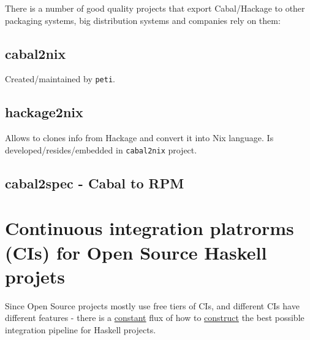 \documentclass[a4paper,14pt,oneside]{book}
\begin{document}
There is a number of good quality projects that export Cabal/Hackage to other packaging systems, big distribution systems and companies rely on them:

\section{cabal2nix}
\label{sec:org013737e}

Created/maintained by \texttt{peti}.

\section{hackage2nix}
\label{sec:org140e539}

Allows to clones info from Hackage and convert it into Nix language.
Is developed/resides/embedded in \texttt{cabal2nix} project.

\section{cabal2spec - Cabal to RPM}
\label{sec:org54756aa}

\chapter{Continuous integration platrorms (CIs) for Open Source Haskell projets}
\label{sec:org0462b2f}

Since Open Source projects mostly use free tiers of CIs, and different CIs have different features - there is a \hyperref[orge0c7620]{constant} flux of how to \hyperref[org1d44cba]{construct} the best possible integration pipeline for Haskell projects.
\end{document}
